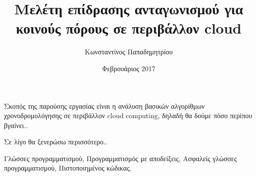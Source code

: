 \documentclass[diploma]{softlab-thesis}
\begin{document}

\frontmatter

\title{Μελέτη επίδρασης ανταγωνισμού για κοινούς πόρους σε περιβάλλον cloud}
\author{Κωνσταντίνος Παπαδημητρίου}
\date{Φεβρουάριος 2017}




\maketitle



\begin{abstractgr}%
Σκοπός της παρούσης εργασίας είναι η ανάλυση βασικών αλγορίθμων χρονοδρομολόγησης σε περιβάλλον cloud computing, δηλαδή
θα δούμε πόσο περίπου βγαίνει..

Σε λίγο θα ξενερώσω περισσότερο..
\begin{keywordsgr}
Γλώσσες προγραμματισμού, Προγραμματισμός με αποδείξεις, Ασφαλείς γλώσσες
προγραμματισμού, Πιστοποιημένος κώδικας.
\end{keywordsgr}
\end{abstractgr}


\end{document}
